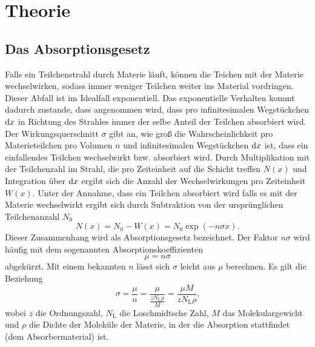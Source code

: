 
\section{Theorie}
\label{sec:Theorie}

\subsection{Das Absorptionsgesetz}
Falls ein Teilchenstrahl durch Materie läuft, können die Teichen mit der Materie wechselwirken, sodass immer weniger Teilchen weiter ins Material vordringen. Dieser Abfall ist im Idealfall exponentiell. Das exponentielle Verhalten kommt dadurch zustande, dass angenommen wird, dass pro infinitesimalen Wegstückchen $\mathop{}\!\mathrm{d} x$ in Richtung des Strahles immer der selbe Anteil der Teilchen absorbiert wird. Der Wirkungsquerschnitt $\sigma$ gibt an, wie groß die Wahrscheinlichkeit pro Materieteilchen pro Volumen $n$ und infinitesimalen Wegstückchen $\mathop{}\!\mathrm{d} x$ ist, dass ein einfallendes Teilchen wechselwirkt bzw. absorbiert wird. Durch Multiplikation mit der Teilchenzahl im Strahl, die pro Zeiteinheit auf die Schicht treffen $N(x)$ und Integration über $\mathop{}\!\mathrm{d} x$ ergibt sich die Anzahl der Wechselwirkungen pro Zeiteinheit $W(x)$. Unter der Annahme, dass ein Teilchen absorbiert wird falls es mit der Materie wechselwirkt ergibt sich durch Subtraktion von der ursprünglichen Teilchenanzahl $N_0$
\begin{equation}
	N(x)=N_0-W(x)=N_0 \exp(-n \sigma x)\text{.}
\end{equation}
Dieser Zusammenhang wird als Absorptionsgesetz bezeichnet. 
Der Faktor $n \sigma$ wird häufig mit dem sogenannten Absorptionskoeffizienten
\begin{equation}
	\mu = n \sigma
\end{equation}
abgekürzt. Mit einem bekannten $n$ lässt sich $\sigma$ leicht aus $\mu$ berechnen.
Es gilt die Beziehung
\begin{equation}
	\sigma = \frac{\mu}{n}=\frac{\mu}{\frac{z N_\text{L} \rho}{M}}=\frac{\mu M}{z N_\text{L} \rho}\text{,}
\end{equation}
wobei $z$ die Ordnungszahl, $N_\text{L}$ die Loschmidtsche Zahl, $M$ das Molekulargewicht und $\rho$ die Dichte der Moleküle der Materie, in der die Absorption stattfindet (dem Absorbermaterial) ist.


